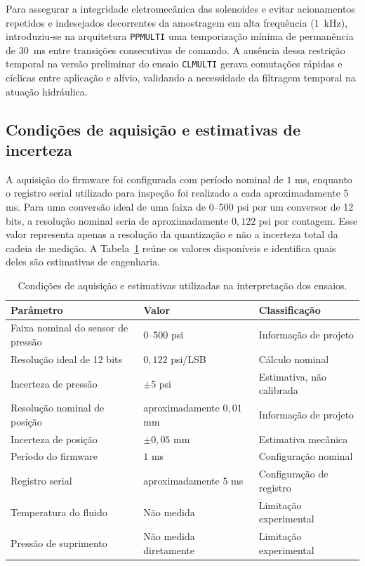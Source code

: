 Para assegurar a integridade eletromecânica das solenoides e evitar acionamentos repetidos e indesejados decorrentes da amostragem em alta frequência (1~kHz), introduziu-se na arquitetura \texttt{PPMULTI} uma temporização mínima de permanência de 30~ms entre transições consecutivas de comando. A ausência dessa restrição temporal na versão preliminar do ensaio \texttt{CLMULTI} gerava comutações rápidas e cíclicas entre aplicação e alívio, validando a necessidade da filtragem temporal na atuação hidráulica.

\subsection{Condições de aquisição e estimativas de incerteza}
\label{sec:resultado-final-incerteza}
A aquisição do firmware foi configurada com período nominal de $1$ ms, enquanto o registro serial utilizado para inspeção foi realizado a cada aproximadamente $5$ ms. Para uma conversão ideal de uma faixa de 0--500 psi por um conversor de 12 bits, a resolução nominal seria de aproximadamente $0,122$ psi por contagem. Esse valor representa apenas a resolução da quantização e não a incerteza total da cadeia de medição. A Tabela~\ref{tab:resultado-final-aquisicao} reúne os valores disponíveis e identifica quais deles são estimativas de engenharia.

\begin{table}[htbp]
    \centering
    \caption{Condições de aquisição e estimativas utilizadas na interpretação dos ensaios.}
    \label{tab:resultado-final-aquisicao}
    \begin{tabular}{l l l}
        \toprule
        Parâmetro & Valor & Classificação \\
        \midrule
        Faixa nominal do sensor de pressão & 0--500 psi & Informação de projeto \\
        Resolução ideal de 12 bits & $0,122$ psi/LSB & Cálculo nominal \\
        Incerteza de pressão & $\pm5$ psi & Estimativa, não calibrada \\
        Resolução nominal de posição & aproximadamente $0,01$ mm & Informação de projeto \\
        Incerteza de posição & $\pm0,05$ mm & Estimativa mecânica \\
        Período do firmware & $1$ ms & Configuração nominal \\
        Registro serial & aproximadamente $5$ ms & Configuração de registro \\
        Temperatura do fluido & Não medida & Limitação experimental \\
        Pressão de suprimento & Não medida diretamente & Limitação experimental \\
        \bottomrule
    \end{tabular}
\end{table}

